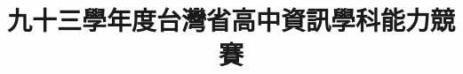 \documentclass[12pt,a4paper]{report}
\begin{document}
\begin{CJK}{UTF8}{bkai}

\renewcommand{\figurename}{圖}
\renewcommand{\tablename}{表}
\renewcommand{\contentsname}{目~錄~}
\renewcommand{\listfigurename}{插~圖~目~錄}
\renewcommand{\listtablename}{表~格~目~錄}
\renewcommand{\appendixname}{附~錄}
\renewcommand{\bibname}{參~考~文~獻}     %
\renewcommand{\indexname}{索~引}
\renewcommand{\today}{\number\year~年~\number\month~月~\number\day~日}

\title{九十三學年度台灣省高中資訊學科能力競賽}
\date{}
\maketitle


\end{CJK}
\end{document}
